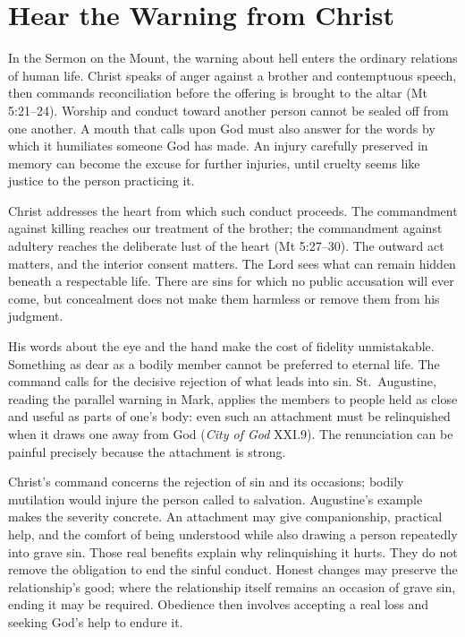 \section{Hear the Warning from Christ}

In the Sermon on the Mount, the warning about hell enters the ordinary relations of human life. Christ speaks of anger against a brother and contemptuous speech, then commands reconciliation before the offering is brought to the altar (Mt 5:21--24). Worship and conduct toward another person cannot be sealed off from one another. A mouth that calls upon God must also answer for the words by which it humiliates someone God has made. An injury carefully preserved in memory can become the excuse for further injuries, until cruelty seems like justice to the person practicing it.

Christ addresses the heart from which such conduct proceeds. The commandment against killing reaches our treatment of the brother; the commandment against adultery reaches the deliberate lust of the heart (Mt 5:27--30). The outward act matters, and the interior consent matters. The Lord sees what can remain hidden beneath a respectable life. There are sins for which no public accusation will ever come, but concealment does not make them harmless or remove them from his judgment.

His words about the eye and the hand make the cost of fidelity unmistakable. Something as dear as a bodily member cannot be preferred to eternal life. The command calls for the decisive rejection of what leads into sin. St.~Augustine, reading the parallel warning in Mark, applies the members to people held as close and useful as parts of one's body: even such an attachment must be relinquished when it draws one away from God (\emph{City of God} XXI.9). The renunciation can be painful precisely because the attachment is strong.

Christ's command concerns the rejection of sin and its occasions; bodily mutilation would injure the person called to salvation. Augustine's example makes the severity concrete. An attachment may give companionship, practical help, and the comfort of being understood while also drawing a person repeatedly into grave sin. Those real benefits explain why relinquishing it hurts. They do not remove the obligation to end the sinful conduct. Honest changes may preserve the relationship's good; where the relationship itself remains an occasion of grave sin, ending it may be required. Obedience then involves accepting a real loss and seeking God's help to endure it.


